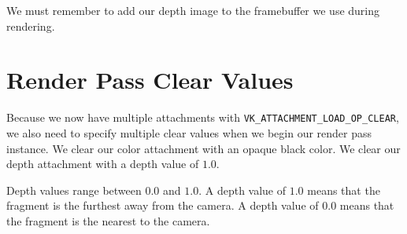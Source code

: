 We must remember to add our depth image to the framebuffer we use during
rendering.

\begin{minipage}{\linewidth}{\noindent}
    
\end{minipage}

\section{Render Pass Clear Values}

Because we now have multiple attachments with
\texttt{VK\_ATTACHMENT\_LOAD\_OP\_CLEAR}, we also need to specify multiple
clear values when we begin our render pass instance.
We clear our color attachment with an opaque black color.
We clear our depth attachment with a depth value of $1.0$.

Depth values range between $0.0$ and $1.0$.
A depth value of $1.0$ means that the fragment is the furthest away from
the camera.
A depth value of $0.0$ means that the fragment is the nearest to
the camera.

\begin{minipage}{\linewidth}{\noindent}
    
\end{minipage}
